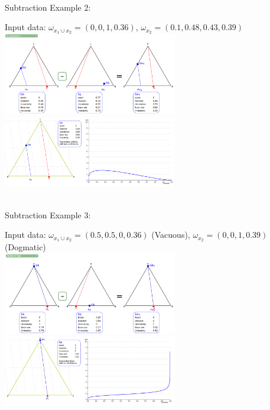 \documentclass[UTF8]{article}
\newcommand{\opinion}[5]{$\omega_{#1} = (#2, #3, #4, #5)$}
\begin{document}
\hrulefill\\
Subtraction Example 2:
    \begin{center}
        Input data: 
        \opinion{x_1 \cup x_2}{0}{0}{1}{0.36}, 
        \opinion{x_2}{0.1}{0.48}{0.43}{0.39}\\
        \includegraphics[width=3in]{images/sub2.png}
        \includegraphics[width=3in]{images/sub2viz.png}
    \end{center}
    \hrulefill\\
Subtraction Example 3:
    \begin{center}
        Input data: 
        \opinion{x_1 \cup x_2}{0.5}{0.5}{0}{0.36} (Vacuous), 
        \opinion{x_2}{0}{0}{1}{0.39} (Dogmatic)\\
        \includegraphics[width=3in]{images/sub3.png}
        \includegraphics[width=3in]{images/sub3viz.png}
\end{center}
\end{document}

